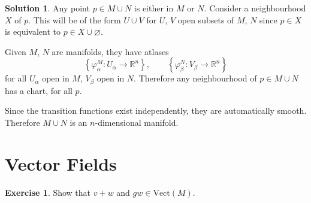 \documentclass[11pt, a4paper]{article}
\theoremstyle{definition}
\newtheorem{ex}{Exercise}[part]
\newtheorem{sol}{Solution}[part]
\begin{document}
\begin{sol}

Any point $p \in M \cup N$ is either in $M$ or $N$. Consider a neighbourhood $X$ of $p$. This will be of the form $U \cup V$ for $U$, $V$ open subsets of $M$, $N$ since $p \in X$ is equivalent to $p \in X \cup \varnothing$.

Given $M$, $N$ are manifolds, they have atlases
\[
    \left\{\varphi^M_\alpha: U_\alpha \to \mathbb{R}^n \right\}, \qquad
    \left\{\varphi^N_\beta: V_\beta \to \mathbb{R}^n \right\}
\]
for all $U_\alpha$ open in $M$, $V_\beta$ open in $N$. Therefore any neighbourhood of $p \in M \cup N$ has a chart, for all $p$.

Since the transition functions exist independently, they are automatically smooth. Therefore $M \cup N$ is an $n$-dimensional manifold.

\end{sol}

\section{Vector Fields}

\begin{ex}

Show that $v + w$ and $gw \in \text{Vect}(M)$.

\end{ex}
\end{document}
